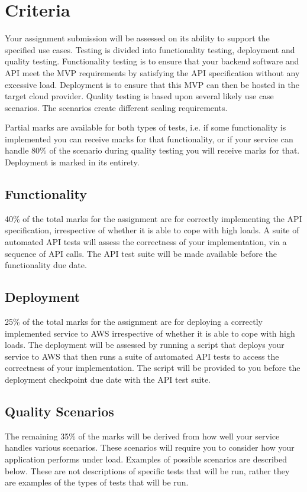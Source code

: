 \documentclass{csse4400}
\begin{document}
\section{Criteria}
Your assignment submission will be assessed on its ability to support the specified use cases. Testing is divided into functionality testing, deployment and quality testing. Functionality testing is to ensure that your backend software and API meet the MVP requirements by satisfying the API specification without any excessive load. Deployment is to ensure that this MVP can then be hosted in the target cloud provider. Quality testing is based upon several likely use case scenarios. The scenarios create different scaling requirements.

Partial marks are available for both types of tests, i.e. if some functionality is implemented you can receive marks for that functionality, or if your service can handle 80\% of the scenario during quality testing you will receive marks for that. Deployment is marked in its entirety.

\subsection{Functionality}
40\% of the total marks for the assignment are for correctly implementing the API specification, irrespective of whether it is able to cope with high loads. A suite of automated API tests will assess the correctness of your implementation, via a sequence of API calls. The API test suite will be made available before the functionality due date.

\subsection{Deployment}
25\% of the total marks for the assignment are for deploying a correctly implemented service to AWS irrespective of whether it is able to cope with high loads. The deployment will be assessed by running a script that deploys your service to AWS that then runs a suite of automated API tests to access the correctness of your implementation. The script will be provided to you before the deployment checkpoint due date with the API test suite.

\subsection{Quality Scenarios}\label{sec:scenarios}
The remaining 35\% of the marks will be derived from how well your service handles various scenarios. These scenarios will require you to consider how your application performs under load. Examples of possible scenarios are described below. These are not descriptions of specific tests that will be run, rather they are examples of the types of tests that will be run.
\end{document}
